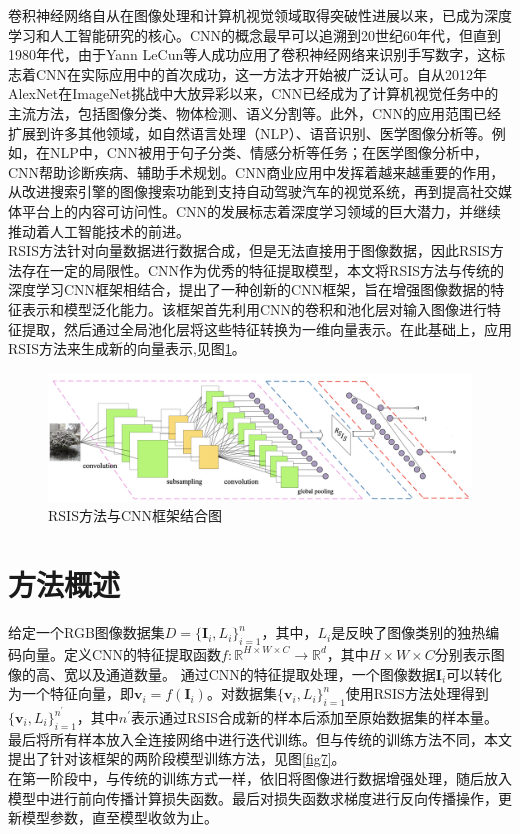 \documentclass{NauThesis}
\begin{document}
卷积神经网络自从在图像处理和计算机视觉领域取得突破性进展以来，已成为深度学习和人工智能研究的核心。CNN的概念最早可以追溯到20世纪60年代，但直到1980年代，由于Yann LeCun等人成功应用了卷积神经网络来识别手写数字，这标志着CNN在实际应用中的首次成功，这一方法才开始被广泛认可。自从2012年AlexNet在ImageNet挑战中大放异彩以来，CNN已经成为了计算机视觉任务中的主流方法，包括图像分类、物体检测、语义分割等。此外，CNN的应用范围已经扩展到许多其他领域，如自然语言处理（NLP）、语音识别、医学图像分析等。例如，在NLP中，CNN被用于句子分类、情感分析等任务；在医学图像分析中，CNN帮助诊断疾病、辅助手术规划。CNN商业应用中发挥着越来越重要的作用，从改进搜索引擎的图像搜索功能到支持自动驾驶汽车的视觉系统，再到提高社交媒体平台上的内容可访问性。CNN的发展标志着深度学习领域的巨大潜力，并继续推动着人工智能技术的前进。
\\\hspace*{2em}RSIS方法针对向量数据进行数据合成，但是无法直接用于图像数据，因此RSIS方法存在一定的局限性。CNN作为优秀的特征提取模型，本文将RSIS方法与传统的深度学习CNN框架相结合，提出了一种创新的CNN框架，旨在增强图像数据的特征表示和模型泛化能力。该框架首先利用CNN的卷积和池化层对输入图像进行特征提取，然后通过全局池化层将这些特征转换为一维向量表示。在此基础上，应用RSIS方法来生成新的向量表示,见图\ref{fig10}。
\\
\begin{figure}[htbp]
    \centering
    \includegraphics[width=1.0\textwidth]{figs/fig10.png}
    \caption{RSIS方法与CNN框架结合图}
    \label{fig10}
\end{figure}

\newpage
\section{方法概述}
给定一个RGB图像数据集$D=\{\boldsymbol{I}_i,L_i \}_{i=1}^n$，其中，$L_i$是反映了图像类别的独热编码向量。定义CNN的特征提取函数$f:\mathbb{R}^{H\times W\times C}\rightarrow \mathbb{R}^d$，其中$H\times W\times C$分别表示图像的高、宽以及通道数量。
通过CNN的特征提取处理，一个图像数据$\boldsymbol{I}_i$可以转化为一个特征向量，即$\boldsymbol{v}_i=f(\boldsymbol{I}_i)$。对数据集$\{\boldsymbol{v}_i,L_i \}_{i=1}^n$使用RSIS方法处理得到$\{\boldsymbol{v}_i,L_i\}_{i=1}^{n^\prime}$，其中$n^\prime$表示通过RSIS合成新的样本后添加至原始数据集的样本量。
最后将所有样本放入全连接网络中进行迭代训练。但与传统的训练方法不同，本文提出了针对该框架的两阶段模型训练方法，见图\ref{fig7}。
\\\hspace*{2em}在第一阶段中，与传统的训练方式一样，依旧将图像进行数据增强处理，随后放入模型中进行前向传播计算损失函数。最后对损失函数求梯度进行反向传播操作，更新模型参数，直至模型收敛为止。
\\
\end{document}
